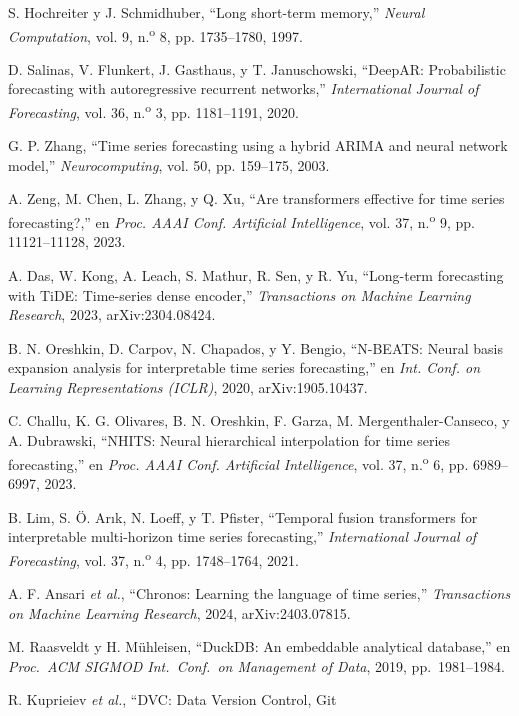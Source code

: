\documentclass[12pt,letterpaper]{report}
\begin{document}
{\begin{enumerate}[label={[\arabic*]}, leftmargin=*, itemsep=0pt, parsep=0pt, topsep=0pt]
\item\label{bib:33} S. Hochreiter y J. Schmidhuber, ``Long short-term memory,''
\textit{Neural Computation}, vol. 9, n.\textsuperscript{o} 8, pp. 1735--1780, 1997.
\item\label{bib:34} D. Salinas, V. Flunkert, J. Gasthaus, y T. Januschowski,
``DeepAR: Probabilistic forecasting with autoregressive recurrent networks,''
\textit{International Journal of Forecasting}, vol. 36, n.\textsuperscript{o} 3,
pp. 1181--1191, 2020.
\item\label{bib:35} G. P. Zhang, ``Time series forecasting using a hybrid ARIMA and
neural network model,'' \textit{Neurocomputing}, vol. 50, pp. 159--175, 2003.
\item\label{bib:36} A. Zeng, M. Chen, L. Zhang, y Q. Xu, ``Are transformers effective for time series forecasting?,'' en \textit{Proc. AAAI Conf. Artificial Intelligence}, vol. 37, n.\textsuperscript{o} 9, pp. 11121--11128, 2023.
\item\label{bib:37} A. Das, W. Kong, A. Leach, S. Mathur, R. Sen, y R. Yu, ``Long-term forecasting with TiDE: Time-series dense encoder,'' \textit{Transactions on Machine Learning Research}, 2023, arXiv:2304.08424.
\item\label{bib:38} B. N. Oreshkin, D. Carpov, N. Chapados, y Y. Bengio, ``N-BEATS: Neural basis expansion analysis for interpretable time series forecasting,'' en \textit{Int. Conf. on Learning Representations (ICLR)}, 2020, arXiv:1905.10437.
\item\label{bib:39} C. Challu, K. G. Olivares, B. N. Oreshkin, F. Garza, M. Mergenthaler-Canseco, y A. Dubrawski, ``NHITS: Neural hierarchical interpolation for time series forecasting,'' en \textit{Proc. AAAI Conf. Artificial Intelligence}, vol. 37, n.\textsuperscript{o} 6, pp. 6989--6997, 2023.
\item\label{bib:40} B. Lim, S. Ö. Ar{\i}k, N. Loeff, y T. Pfister, ``Temporal fusion transformers for interpretable multi-horizon time series forecasting,'' \textit{International Journal of Forecasting}, vol. 37, n.\textsuperscript{o} 4, pp. 1748--1764, 2021.
\item\label{bib:41} A. F. Ansari \textit{et al.}, ``Chronos: Learning the language of time series,'' \textit{Transactions on Machine Learning Research}, 2024, arXiv:2403.07815.
\item\label{bib:42} M. Raasveldt y H. M\"uhleisen, ``DuckDB: An embeddable analytical
database,'' en \textit{Proc.\ ACM SIGMOD Int.\ Conf.\ on Management of Data}, 2019, pp.\ 1981--1984.
\item\label{bib:43} R. Kuprieiev \textit{et al.}, ``DVC: Data Version Control, Git

\end{enumerate}}
\end{document}
